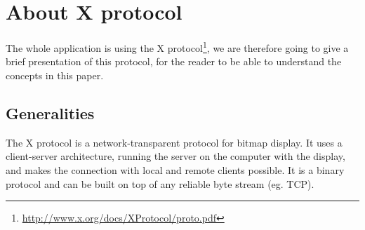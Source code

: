 \section{About X protocol}
The whole application is using the X protocol\footnote{\url{http://www.x.org/docs/XProtocol/proto.pdf}}, we are therefore going
to give a brief presentation of this protocol, for the reader to be able 
to understand the concepts in this paper.
\subsection{Generalities}
The X protocol is a network-transparent protocol for bitmap display. 
It uses a client-server architecture, running the server on the computer 
with the display, and makes the connection with local and remote clients possible. 
It is a binary protocol and can be built on top of any reliable byte stream (eg. TCP).
